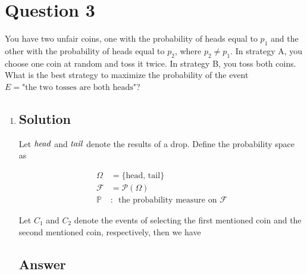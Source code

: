 \documentclass[12pt]{article}
\newcommand{\bP}{\mathbb{P}}
\begin{document}
	
	\section*{Question 3}
	
	\noindent You have two unfair coins, one with the probability of heads equal to $p_1$ and the other with the probability of heads equal to $p_2$, where $p_2 \neq p_1$. In strategy A, you choose one coin at random and toss it twice. In strategy B, you toss both coins. What is the best strategy to maximize the probability of the event $E = \text{"the two tosses are both heads"}$?
	
	\begin{enumerate}[label={},leftmargin=0in]\item
		
		\subsection*{Solution}
			
			Let $\it{head}$ and $\it{tail}$ denote the results of a drop. Define the probability space as
		
			\[
			\begin{aligned}
				\Omega &= \{\mathrm{head},\,\mathrm{tail}\}\\
				\mathcal{F} &= \mathcal{P}(\Omega)\\
				\bP &:\enspace \text{the probability measure on $\mathcal{F}$}
			\end{aligned}
			\]
			
			Let $C_1$ and $C_2$ denote the events of selecting the first mentioned coin and the second mentioned coin, respectively, then we have
			
			
			
		\subsection*{Answer}
		
			\[\boxed{}\]
	
	\end{enumerate}
\end{document}
